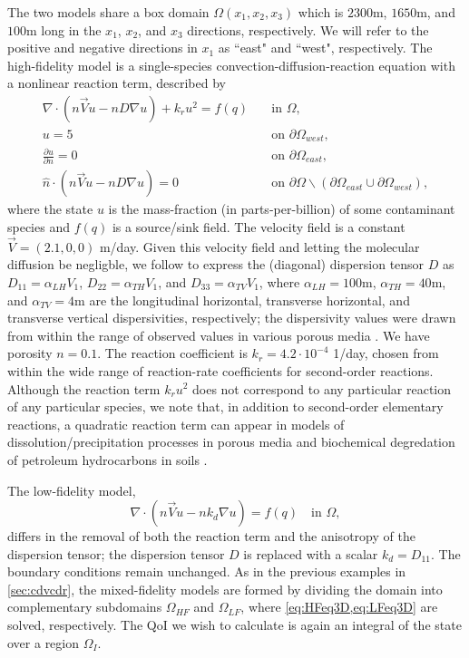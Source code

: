 The two models share a box domain $\Omega(x_1,x_2,x_3)$ which is $2300$m, $1650$m, and $100$m long in the $x_1$, $x_2$, and $x_3$ directions, respectively. We will refer to the positive and negative directions in $x_1$ as ``east" and ``west", respectively. The high-fidelity model is a single-species convection-diffusion-reaction equation with a nonlinear reaction term, described by
%
\begin{subequations}
\label{eq:cdvcdrHF3D}
\begin{align}
\nabla\cdot(n\vec{V}u - nD\nabla u) + k_ru^2 = f(q) \quad &\text{in } \Omega, \label{eq:HFeq3D}\\
u = 5 \quad &\text{on } \partial \Omega_{west}, \\
\frac{\partial u}{\partial n} = 0 \quad &\text{on }\partial\Omega_{east}, \\
\hat{n}\cdot(n\vec{V}u - nD\nabla u) = 0 \quad &\text{on }\partial\Omega\backslash(\partial\Omega_{east}\cup\partial\Omega_{west}),
\end{align} 
\end{subequations}
%
where the state $u$ is the mass-fraction (in parts-per-billion) of some contaminant species and $f(q)$ is a source/sink field. The velocity field is a constant $\vec{V}=(2.1,0,0)$ m/day. Given this velocity field and letting the molecular diffusion be negligble, we follow \cite{Vestedetal93} to express the (diagonal) dispersion tensor $D$ as $D_{11}=\alpha_{LH}V_1$, $D_{22}=\alpha_{TH}V_1$, and $D_{33}=\alpha_{TV}V_1$, where $\alpha_{LH}=100$m, $\alpha_{TH}=40$m, and $\alpha_{TV}=4$m are the longitudinal horizontal, transverse horizontal, and transverse vertical dispersivities, respectively; the dispersivity values were drawn from within the range of observed values in various porous media \cite{Davis86}. We have porosity $n=0.1$. The reaction coefficient is $k_r=4.2\cdot10^{-4}$ 1/day, chosen from within the wide range of reaction-rate coefficients for second-order reactions. Although the reaction term $k_ru^2$ does not correspond to any particular reaction of any particular species, we note that, in addition to second-order elementary reactions, a quadratic reaction term can appear in models of dissolution/precipitation processes in porous media \cite{Aha97} and biochemical degredation of petroleum hydrocarbons in soils \cite{Jack94}.

The low-fidelity model,
%
\begin{equation}
\nabla\cdot(n\vec{V}u - nk_d\nabla u) = f(q) \quad \text{in } \Omega, \label{eq:LFeq3D}
\end{equation}
%
differs in the removal of both the reaction term and the anisotropy of the dispersion tensor; the dispersion tensor $D$ is replaced with a scalar $k_d=D_{11}$. The boundary conditions remain unchanged. As in the previous examples in \cref{sec:cdvcdr}, the mixed-fidelity models are formed by dividing the domain into complementary subdomains $\Omega_{HF}$ and $\Omega_{LF}$, where \cref{eq:HFeq3D,eq:LFeq3D} are solved, respectively. The QoI we wish to calculate is again an integral of the state over a region $\Omega_I$. 

